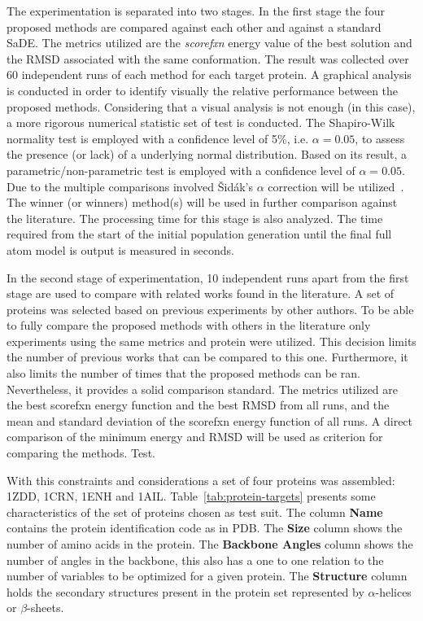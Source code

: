 The experimentation is separated into two stages. In the first stage the four
proposed methods are compared against each other and against a standard
\ac{SaDE}. The metrics utilized are the \textit{scorefxn} energy value of the
best solution and the \ac{RMSD} associated with the same conformation.  The
result was collected over 60 independent runs of each method for each target
protein. A graphical analysis is conducted in order to identify visually the
relative performance between the proposed methods.  Considering that a visual
analysis is not enough (in this case), a more rigorous numerical statistic set
of test is conducted.  The Shapiro-Wilk~\cite{wilk1968joint} normality test is
employed with a confidence level of 5\%, i.e. $\alpha = 0.05$, to assess the
presence (or lack) of a underlying normal distribution. Based on its result, a
parametric/non-parametric test is employed with a confidence level of $\alpha =
0.05$. Due to the multiple comparisons involved \v{S}idák's $\alpha$ correction
will be utilized~\cite{vsidak1967rectangular}.  The winner (or winners)
method(s) will be used in further comparison against the literature.  The
processing time for this stage is also analyzed. The time required from the
start of the initial population generation until the final full atom model is
output is measured in seconds.

In the second stage of experimentation, 10 independent runs apart from the
first stage are used to compare with related works found in the literature. A
set of proteins was selected based on previous experiments by other authors. To
be able to fully compare the proposed methods with others in the literature
only experiments using the same metrics and protein were utilized. This
decision limits the number of previous works that can be compared to this one.
Furthermore, it also limits the number of times that the proposed methods can
be ran. Nevertheless, it provides a solid comparison standard. The metrics
utilized are the best scorefxn energy function and the best \ac{RMSD} from all
runs, and the mean and standard deviation of the scorefxn energy function of
all runs. A direct comparison of the minimum energy and \ac{RMSD} will be used
as criterion for comparing the methods. %
Test.
%

With this constraints and considerations a set of four proteins was assembled:
1ZDD, 1CRN, 1ENH and 1AIL. Table~\ref{tab:protein-targets} presents some
characteristics of the set of proteins chosen as test suit.  The column
\textbf{Name} contains the protein identification code as in PDB.  The
\textbf{Size} column shows the number of amino acids in the protein.  The
\textbf{Backbone Angles} column shows the number of angles in the backbone,
this also has a one to one relation to the number of variables to be optimized
for a given protein. The \textbf{Structure} column holds the secondary
structures present in the protein set represented by $\alpha$-helices or
$\beta$-sheets.

